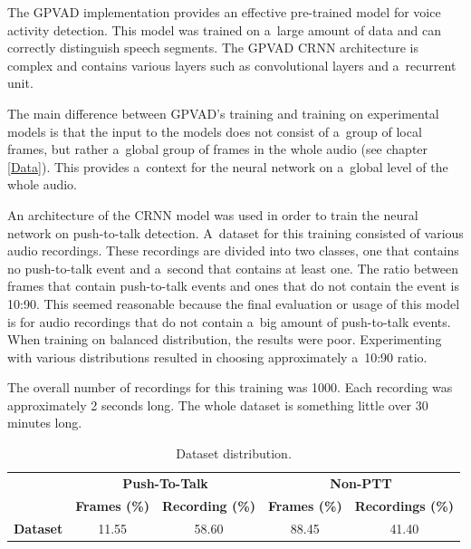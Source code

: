     The GPVAD implementation provides an effective pre-trained model for voice activity detection. This model was trained on a~large amount of data and can correctly distinguish speech segments. The GPVAD CRNN architecture is complex and contains various layers such as convolutional layers and a~recurrent unit. 


    The main difference between GPVAD's training and training on experimental models is that the input to the models does not consist of a~group of local frames, but rather a~global group of frames in the whole audio (see chapter \ref{Data}). This provides a~context for the neural network on a~global level of the whole audio. 


    An architecture of the CRNN model was used in order to train the neural network on push-to-talk detection. A~dataset for this training consisted of various audio recordings. These recordings are divided into two classes, one that contains no push-to-talk event and a~second that contains at least one. The ratio between frames that contain push-to-talk events and ones that do not contain the event is 10:90. This seemed reasonable because the final evaluation or usage of this model is for audio recordings that do not contain a~big amount of push-to-talk events. When training on balanced distribution, the results were poor. Experimenting with various distributions resulted in choosing approximately a~10:90 ratio. 
    
    The overall number of recordings for this training was 1000. Each recording was approximately 2 seconds long. The whole dataset is something little over 30 minutes long.

    \begin{table}[!h]
    \begin{center}
    \begin{tabular}{|c|c|c|c|c|}\hline 
        \multirow{2}{*}{} & \multicolumn{2}{c|}{\textbf{Push-To-Talk}} & \multicolumn{2}{c|}{\textbf{Non-PTT}}\\\cline{2-5}
         & \textbf{Frames (\%)} & \textbf{Recording (\%)} & \textbf{Frames (\%)} & \textbf{Recordings (\%)} \\ \hline
         \textbf{Dataset} & 11.55 & 58.60 & 88.45 & 41.40 \\ \hline
    \end{tabular}
    \caption{Dataset distribution.}
    \label{tableparametersGPVAD}
    \end{center}
    \end{table}

